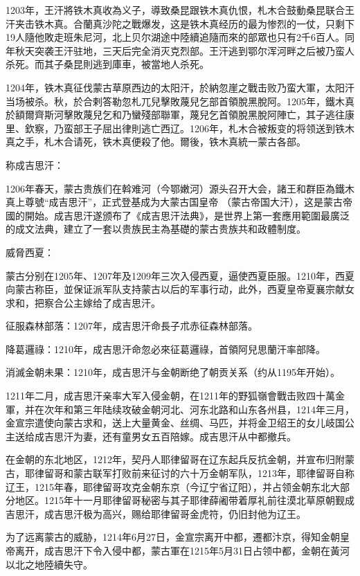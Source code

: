 1203年，王汗將铁木真收為义子，導致桑昆跟铁木真仇恨，札木合鼓動桑昆联合王汗夹击铁木真。合蘭真沙陀之戰爆发，这是铁木真经历的最为惨烈的一仗，只剩下19人隨他敗走班朱尼河，北上贝尔湖途中陸續追隨而來的部眾也只有2千6百人。同年秋天突袭王汗驻地，三天后完全消灭克烈部。王汗逃到鄂尔浑河畔之后被乃蛮人杀死。而其子桑昆則逃到庫車，被當地人杀死。

1204年，铁木真征伐蒙古草原西边的太阳汗，於納忽崖之戰击败乃蛮大軍，太阳汗当场被杀。秋，於合剌答勒忽札兀兒擊敗蔑兒乞部首領脫黑脫阿。1205年，鐵木真於額爾齊斯河擊敗蔑兒乞和乃蠻殘部聯軍，蔑兒乞首領脫黑脫阿陣亡，其子逃往康里、欽察，乃蛮部王子屈出律則逃亡西辽。1206年，札木合被叛变的将领送到铁木真之手，札木合请死，铁木真便殺了他。爾後，铁木真統一蒙古各部。

称成吉思汗：

1206年春天，蒙古贵族们在斡难河（今鄂嫩河）源头召开大会，諸王和群臣為鐵木真上尊號“成吉思汗”，正式登基成为大蒙古国皇帝 （蒙古帝国大汗），这是蒙古帝國的開始。成吉思汗遂颁布了《成吉思汗法典》，是世界上第一套應用範圍最廣泛的成文法典，建立了一套以贵族民主為基礎的蒙古贵族共和政體制度。

威脅西夏：

蒙古分别在1205年、1207年及1209年三次入侵西夏，逼使西夏臣服。1210年，西夏向蒙古称臣，並保证派军队支持蒙古以后的军事行动，此外，西夏皇帝夏襄宗献女求和，把察合公主嫁给了成吉思汗。

征服森林部落：1207年，成吉思汗命長子朮赤征森林部落。

降葛邏祿：1210年，成吉思汗命忽必來征葛邏祿，首領阿兒思蘭汗率部降。

消滅金朝未果：1210年，成吉思汗与金朝断绝了朝贡关系（约从1195年开始）。

1211年二月，成吉思汗亲率大军入侵金朝，在1211年的野狐嶺會戰击败四十萬金軍，并在次年和第三年陆续攻破金朝河北、河东北路和山东各州县，1214年三月，金宣宗遣使向蒙古求和，送上大量黄金、丝绸、马匹，并将金卫绍王的女儿岐国公主送给成吉思汗为妻，还有童男女五百陪嫁。成吉思汗从中都撤兵。

在金朝的东北地区，1212年，契丹人耶律留哥在辽东起兵反抗金朝，并宣布归附蒙古，耶律留哥和蒙古联军打败前来征讨的六十万金朝军队，1213年，耶律留哥自称辽王，1215年春，耶律留哥攻克金朝东京（今辽宁省辽阳），并占领金朝东北大部分地区。1215年十一月耶律留哥秘密与其子耶律薛阇带着厚礼前往漠北草原朝觐成吉思汗，成吉思汗极为高兴，赐给耶律留哥金虎符，仍旧封他为辽王。

为了远离蒙古的威胁，1214年6月27日，金宣宗离开中都，遷都汴京，得知金朝皇帝离开，成吉思汗下令入侵中都，蒙古軍在1215年5月31日占领中都，金朝在黃河以北之地陸續失守。

